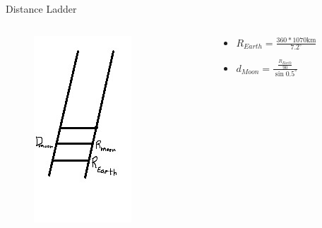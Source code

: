 \documentclass[12pt]{beamer}
\begin{document}
        \begin{frame}{Distance Ladder}
            \begin{columns}
                \begin{column}{0.5\linewidth}
                    \begin{figure}
                        \includegraphics{distanceladder1.jpeg}
                    \end{figure}
                \end{column}
                \begin{column}{0.5\linewidth}
                    \begin{itemize}
                        \item $R_{Earth}=\frac{360*1070\mathrm{km}}{7.2^\circ}$
                        \item $d_{Moon}=\frac{\frac{R_{Earth}}{90}}{\sin{0.5^\circ}}$
                    \end{itemize}
                \end{column}
            \end{columns}
        \end{frame}
\end{document}
